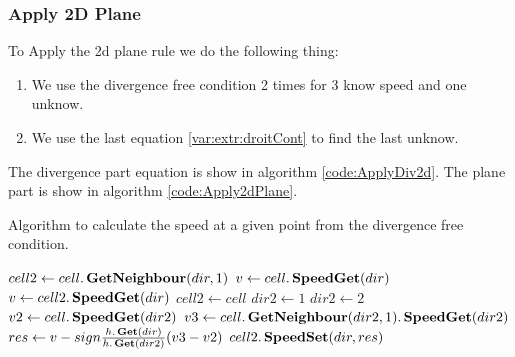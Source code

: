 \subsubsection{Apply 2D Plane}


To Apply the 2d plane rule we do the following thing:
\begin{enumerate}
\item We use the divergence free condition 2 times for 3 know speed and one unknow.
\item We use the last equation \ref{var:extr:droitCont} to find the last unknow.
\end{enumerate}
The divergence part equation is show in algorithm \ref{code:ApplyDiv2d}.
The plane part is show in algorithm \ref{code:Apply2dPlane}.

\begin{algorithm}
\caption{Algorithm to calculate the speed at a given point from the divergence free condition.}
\label{code:ApplyDiv2d}
\begin{algorithmic}[1]
 
	\State $cell2\gets cell.\mathop{\textbf{GetNeighbour}}(dir,1)$ 
	\State $v \gets cell.\mathop{\textbf{SpeedGet}}(dir)$ 
	  
	\State $v \gets cell2.\mathop{\textbf{SpeedGet}}(dir)$
	\State $cell2 \gets cell$
	\EndIf
	\State $dir2 \gets 1$ 
	\State $dir2\gets 2$
	\EndIf
	\State $v2 \gets cell.\mathop{\textbf{SpeedGet}}(dir2)$ 
	\State $v3 \gets cell.\mathop{\textbf{GetNeighbour}}(dir2,1).\mathop{\textbf{SpeedGet}}(dir2)$ 
	\State $res \gets v-sign\frac{h.\mathop{\textbf{Get}}(dir)}{h.\mathop{\textbf{Get}}(dir2)}(v3-v2)$ 
	\State $cell2.\mathop{\textbf{SpeedSet}}(dir,res)$ 
\EndFunction
\end{algorithmic}
\end{algorithm}

